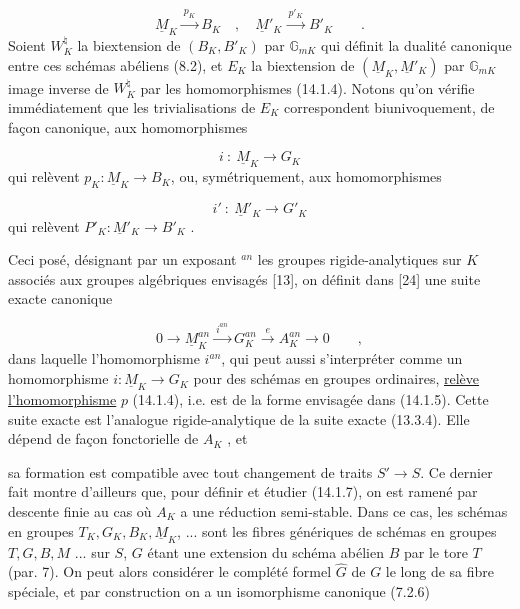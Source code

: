 \begin{equation}\tag{14.1.4}
\underline{M}_K \xrightarrow{\ p_K\ } B_K \quad , \quad \underline{M}'_K \xrightarrow{\ p'_K\ } B'_K \qquad .
\end{equation}
Soient $W_K^{\natural}$ la biextension de $(B_K,B'_K)$ par $\mathbb{G}_{mK}$ qui définit la dualité canonique entre ces schémas abéliens (8.2), et $E_K$ la biextension de $(\underline{M}_K,\underline{M}'_K)$ par $\mathbb{G}_{mK}$ image inverse de $W_K^{\natural}$ par les homomorphismes (14.1.4). Notons qu'on vérifie immédiatement que les trivialisations de $E_K$ correspondent biunivoquement, de façon canonique, aux homomorphismes

\begin{equation}\tag{14.1.5}
i \ : \ \underline{M}_K \longrightarrow G_K
\end{equation}
qui relèvent $p_K : \underline{M}_K \longrightarrow B_K$, ou, symétriquement, aux homomorphismes

\begin{equation}\tag{14.1.6}
i' \ : \ \underline{M}'_K \longrightarrow G'_K
\end{equation}
qui relèvent $P'_K : \underline{M}'_K \longrightarrow B'_K$ .

Ceci posé, désignant par un exposant ${}^{an}$ les groupes rigide-analytiques sur $K$ associés aux groupes algébriques envisagés [13], on définit dans [24] une suite exacte canonique

\begin{equation}\tag{14.1.7}
0 \longrightarrow \underline{M}_K^{an} \xrightarrow{\ i^{an}\ } G_K^{an} \xrightarrow{\ e\ } A_K^{an} \longrightarrow 0 \qquad ,
\end{equation}
dans laquelle l'homomorphisme $i^{an}$, qui peut aussi s'interpréter comme un homomorphisme $i: \underline{M}_K \longrightarrow G_K$ pour des schémas en groupes ordinaires, \underline{relève l'homomorphisme} $p$ (14.1.4), i.e. est de la forme envisagée dans (14.1.5). Cette suite exacte est l'analogue rigide-analytique de la suite exacte (13.3.4). Elle dépend de façon fonctorielle de $A_K$ , et



sa formation est compatible avec tout changement de traits $S' \longrightarrow S$. Ce dernier fait montre d'ailleurs que, pour définir et étudier (14.1.7), on est ramené par descente finie au cas où $A_K$ a une réduction semi-stable. Dans ce cas, les schémas en groupes $T_K,G_K,B_K,\underline{M}_K$, ... sont les fibres génériques de schémas en groupes $T,G,B,M$ ... sur $S$, $G$ étant une extension du schéma abélien $B$ par le tore $T$ (par. 7). On peut alors considérer le complété formel $\hat{G}$ de $G$ le long de sa fibre spéciale, et par construction on a un isomorphisme canonique (7.2.6)

